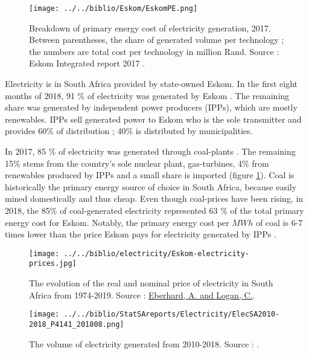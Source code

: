 \documentclass[12pt,english]{article}
\begin{document}

\begin{figure}[!h]
	\centering
	\texttt{[image: ../../biblio/Eskom/EskomPE.png]}
	\caption{\label{Eskom2017PE}Breakdown of primary energy cost of electricity generation, 2017. Between parentheses, the share of generated volume per technology ; the numbers are total cost per technology in million Rand. Source : Eskom Integrated report 2017 \citep{Eskom2017AR}.}
\end{figure}

Electricity is in South Africa provided by state-owned Eskom. In the first eight months of 2018, 91 \% of electricity was generated by Eskom \citep{P4141_201808}. The remaining share was generated by independent power producers (IPPs), which are mostly renewables. IPPs sell generated power to Eskom who is the sole transmitter and provides 60\% of distribution ; 40\% is distributed by municipalities.

In 2017, 85 \% of electricity was generated through coal-plants \citep{Eskom2017AR}. The remaining 15\% stems from the country's sole nuclear plant, gas-turbines, 4\% from renewables produced by IPPs and a small share is imported (figure \ref{Eskom2017PE}). Coal is historically the primary energy source of choice in South Africa, because easily mined domestically and thus cheap. Even though coal-prices have been rising, in 2018, the 85\% of coal-generated electricity represented 63 \% of the total primary energy cost for Eskom. Notably, the primary energy cost per $MWh$ of coal is 6-7 times lower than the price Eskom pays for electricity generated by IPPs \citep{Eskom2017AR}.  

\begin{figure}[!t]
	\centering
	\texttt{[image: ../../biblio/electricity/Eskom-electricity-prices.jpg]}
	\caption{\label{Eskom-electricity-prices} The evolution of the real and nominal price of electricity in South Africa from 1974-2019. Source : \href{https://mybroadband.co.za/news/business/68724-how-lecturers-tore-eskoms-tariff-case-apart-in-25-minutes.html}{Eberhard, A. and Logan, C.}.}
\end{figure}


\begin{figure}[!t]
	\centering
	\texttt{[image: ../../biblio/StatSAreports/Electricity/ElecSA2010-2018\_P4141\_201808.png]}
	\caption{\label{Elecvolume_2010_2018}The volume of electricity generated from 2010-2018. Source : \citep{P4141_201808}.}
\end{figure}
\end{document}

